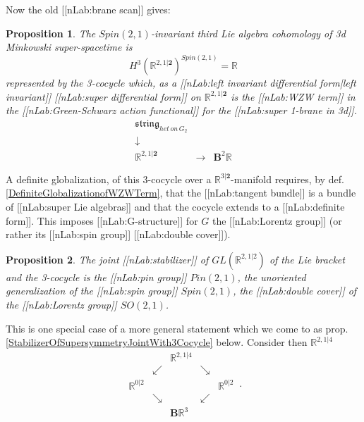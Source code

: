 \documentclass[12pt,titlepage]{article}
\newcommand{\itexarray}[1]{\begin{matrix}#1\end{matrix}}
\theoremstyle{plain}
\newtheorem{prop}{Proposition}
\theoremstyle{definition}
\theoremstyle{remark}
\begin{document}
Now the old [[nLab:brane scan]] gives:
\begin{prop}
\label{}\hypertarget{}{}
The $Spin(2,1)$-invariant third Lie algebra cohomology of 3d Minkowski super-spacetime is
\begin{displaymath}
H^3(\mathbb{R}^{2,1\vert \mathbf{2}})^{Spin(2,1)} = \mathbb{R}
\end{displaymath}
represented by the 3-cocycle which, as a [[nLab:left invariant differential form|left invariant]] [[nLab:super differential form]] on $\mathbb{R}^{2,1\vert \mathbf{2}}$ is the [[nLab:WZW term]] in the [[nLab:Green-Schwarz action functional]] for the [[nLab:super 1-brane in 3d]].
\begin{displaymath}
\itexarray{
     \mathfrak{string}_{het \, on \, G_2}
     \\
     \downarrow
     \\
     \mathbb{R}^{2,1\vert \mathbf{2}}
      &\stackrel{}{\longrightarrow}&
     \mathbf{B}^2 \mathbb{R}
  }
\end{displaymath}
\end{prop}
A definite globalization, of this 3-cocycle over a $\mathbb{R}^{3\vert \mathbf{2}}$-manifold requires, by def. \ref{DefiniteGlobalizationofWZWTerm}, that the [[nLab:tangent bundle]] is a bundle of [[nLab:super Lie algebras]] and that the cocycle extends to a [[nLab:definite form]]. This imposes [[nLab:G-structure]] for $G$ the [[nLab:Lorentz group]] (or rather its [[nLab:spin group]] [[nLab:double cover]]).
\begin{prop}
\label{}\hypertarget{}{}
The joint [[nLab:stabilizer]] of $GL(\mathbb{R}^{2,1\vert 2})$ of the Lie bracket and the 3-cocycle is the [[nLab:pin group]] $Pin(2,1)$, the unoriented generalization of the [[nLab:spin group]] $Spin(2,1)$, the [[nLab:double cover]] of the [[nLab:Lorentz group]] $SO(2,1)$.
\end{prop}
This is one special case of a more general statement which we come to as prop. \ref{StabilizerOfSupersymmetryJointWith3Cocycle} below.
Consider then $\mathbb{R}^{2,1\vert 4}$
\begin{displaymath}
\itexarray{
    && \mathbb{R}^{2,1\vert 4}
    \\
    & \swarrow && \searrow
    \\
    \mathbb{R}^{0 \vert 2} && && \mathbb{R}^{0\vert 2}
    \\
    & \searrow && \swarrow
    \\
    && \mathbf{B} \mathbb{R}^3
  }
  \,.
\end{displaymath}
\end{document}
